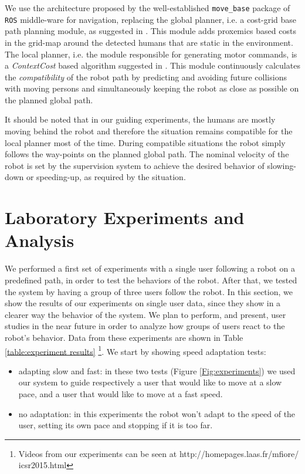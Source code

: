 We use the architecture proposed by the well-established \verb!move_base! package of \verb!ROS! middle-ware \cite{movebase,ros} for navigation, replacing the global planner, i.e. a cost-grid base path planning module, as suggested in \cite{sisbotTRO2007}. This module adds proxemics based costs in the grid-map around the detected humans that are static in the environment. The local planner, i.e. the module responsible for generating motor commands, is a \textit{ContextCost} based algorithm suggested in \cite{kruse12crossing}. This module continuously calculates the \textit{compatibility} of the robot path by predicting and avoiding future collisions with moving persons and simultaneously keeping the robot as close as possible on the planned global path.

It should be noted that in our guiding experiments, the humans are mostly moving behind the robot and therefore the situation remains compatible for the local planner most of the time. During compatible situations the robot simply follows the way-points on the planned global path. The nominal velocity of the robot is set by the supervision system to achieve the desired behavior of slowing-down or speeding-up, as required by the situation. 

\vspace{-10pt}
\section{Laboratory Experiments and Analysis}
We performed a first set of experiments with a single user following a robot on a predefined path, in order to test the behaviors of the robot. After that, we tested the system by having a group of three users follow the robot. In this section, we show the results of our experiments on single user data, since they show in a clearer way the behavior of the system. We plan to perform, and present, user studies in the near future in order to analyze how groups of users react to the robot's behavior. Data from these experiments are shown in Table \ref{table:experiment results} \footnote{Videos from our experiments can be seen at http://homepages.laas.fr/mfiore/
icsr2015.html}. We start by showing speed adaptation tests:
\begin{itemize}
\item adapting slow and fast: in these two tests (Figure \ref{Fig:experiments}) we used our system to guide respectively a user that would like to move at a slow pace, and a user that would like to move at a fast speed.
\item no adaptation: in this experiments the robot won't adapt to the speed of the user, setting its own pace and stopping if it is too far.
\end{itemize}

